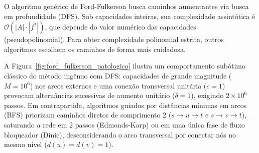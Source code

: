 \documentclass[12pt,a4paper]{article}
\begin{document}
O algoritmo genérico de Ford-Fulkerson busca caminhos aumentantes via busca em profundidade (DFS). Sob capacidades inteiras, sua complexidade assintótica é $\mathcal{O}(|A| \cdot |f^*|)$, que depende do valor numérico das capacidades (pseudopolinomial). Para obter complexidade polinomial estrita, outros algoritmos escolhem os caminhos de forma mais cuidadosa.

A Figura~\ref{fig:ford_fulkerson_patologico} ilustra um comportamento subótimo clássico do método ingênuo com DFS: capacidades de grande magnitude ($M = 10^6$) nos arcos externos e uma conexão transversal unitária ($c=1$) provocam alternâncias sucessivas de aumento unitário ($\delta = 1$), exigindo $2 \times 10^6$ passos. Em contrapartida, algoritmos guiados por distâncias mínimas em arcos (BFS) priorizam caminhos diretos de comprimento 2 ($s \to u \to t$ e $s \to v \to t$), saturando a rede em 2 passos (Edmonds-Karp) ou em uma única fase de fluxo bloqueador (Dinic), desconsiderando o arco transversal por conectar nós no mesmo nível ($d(u) = d(v) = 1$).
\end{document}
